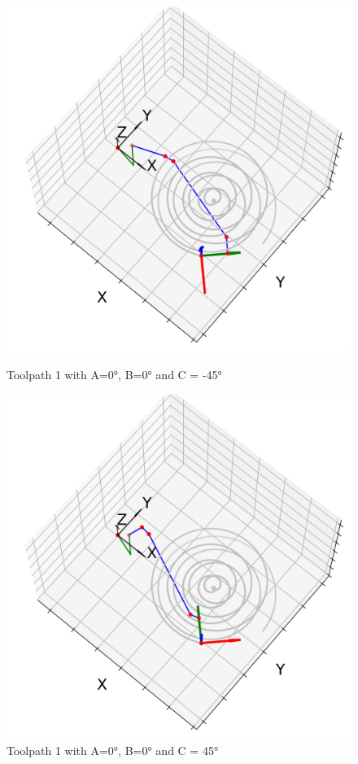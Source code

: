 \begin{figure}[H]
	\centering
	\begin{minipage}{0.5\textwidth}
		\includegraphics[width=\textwidth]{figures/robotANDpath1_-45.png}
		\caption{Toolpath 1 with A=0°, B=0° and C = -45°}
		\label{TP1-25}
	\end{minipage}\hfill
	\begin{minipage}{0.5\textwidth}
		\includegraphics[width=\textwidth]{figures/robotANDpath1_45.png}
		\caption{Toolpath 1 with A=0°, B=0° and C = 45°}
		\label{TP1+25}
	\end{minipage}\par
\end{figure}

